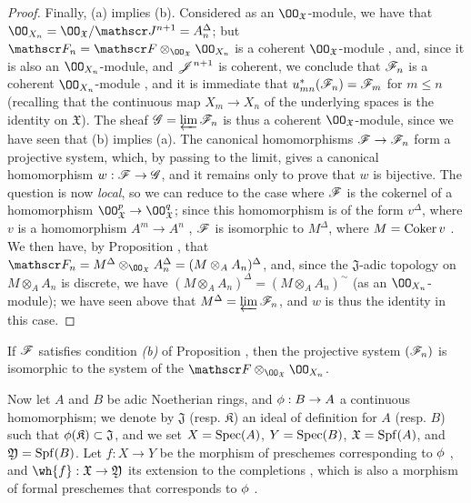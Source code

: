 \begin{proof}
Finally, (a) implies (b).
Considered as an $\OO_\mathfrak{X}$-module, we have that $\OO_{X_n}=\OO_\mathfrak{X}/\sh{J}^{n+1}=A_n^\Delta$; but $\sh{F}_n=\sh{F}\otimes_{\OO_\mathfrak{X}}\OO_{X_n}$ is a coherent $\OO_\mathfrak{X}$-module , and, since it is also an $\OO_{X_n}$-module, and $\mathscr{J}^{n+1}$ is coherent, we conclude that $\mathscr{F}_n$ is a coherent $\OO_{X_n}$-module , and it is immediate that $u_{mn}^*(\mathscr{F}_n)=\mathscr{F}_m$ for $m\leq n$ (recalling that the continuous map $X_m\to X_n$ of the underlying spaces is the identity on $\mathfrak{X}$).
The sheaf $\mathscr{G}=\varprojlim\mathscr{F}_n$ is thus a coherent $\OO_\mathfrak{X}$-module, since we have seen that (b) implies (a). The canonical homomorphisms $\sh{F}\to\sh{F}_n$ form a projective system, which, by passing to the limit, gives a canonical homomorphism $w:\sh{F}\to\sh{G}$, and it remains only to prove that $w$ is bijective.
The question is now \emph{local}, so we can reduce to the case where $\mathscr{F}$ is the cokernel of a homomorphism $\OO_\mathfrak{X}^p\to\OO_\mathfrak{X}^q$; since this homomorphism is of the form $v^\Delta$, where $v$ is a homomorphism $A^m\to A^n$ , $\mathscr{F}$ is isomorphic to $M^\Delta$, where $M=\operatorname{Coker}{v}$ .
We then have, by Proposition , that $\sh{F}_n=M^\Delta\otimes_{\OO_\mathfrak{X}}A_n^\Delta=(M\otimes_A A_n)^\Delta$, and, since the $\mathfrak{J}$-adic topology on $M\otimes_A A_n$ is discrete, we have $(M\otimes_A A_n)^\Delta=(M\otimes_A A_n)^\sim$ (as an $\OO_{X_n}$-module); we have seen above that $M^\Delta=\varprojlim\mathscr{F}_n$, and $w$ is thus the identity in this case.
\end{proof}

\begin{cor}[10.10.6]
\label{1.10.10.6}
If $\mathscr{F}$ satisfies condition \emph{(b)} of Proposition , then the projective system $(\mathscr{F}_n)$ is isomorphic to the system of the $\sh{F}\otimes_{\OO_\mathfrak{X}}\OO_{X_n}$.
\end{cor}

\begin{env}[10.10.7]
\label{1.10.10.7}
Now let $A$ and $B$ be adic Noetherian rings, and $\vphi:B\to A$ a continuous homomorphism; we denote by $\mathfrak{J}$ (resp. $\mathfrak{K}$) an ideal of definition for $A$ (resp. $B$) such that $\phi(\mathfrak{K})\subset\mathfrak{J}$, and we set $X=\operatorname{Spec}(A)$, $Y=\operatorname{Spec}(B)$, $\mathfrak{X}=\operatorname{Spf}(A)$, and $\mathfrak{Y}=\operatorname{Spf}(B)$.
Let $f:X\to Y$ be the morphism of preschemes corresponding to $\phi$ , and $\wh{f}:\mathfrak{X}\to\mathfrak{Y}$ its extension to the completions , which is also a morphism of formal preschemes that corresponds to $\phi$ .
\end{env}

